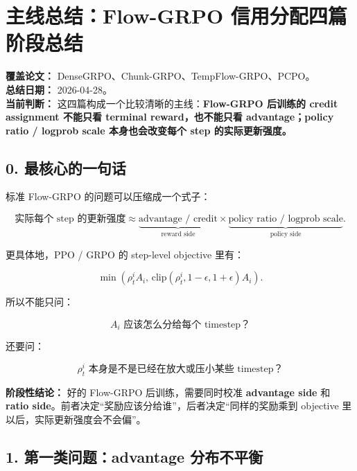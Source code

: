 
\section{主线总结：Flow-GRPO 信用分配四篇阶段总结}

\begin{conceptbox}
\textbf{覆盖论文：} DenseGRPO、Chunk-GRPO、TempFlow-GRPO、PCPO。\\
\textbf{总结日期：} 2026-04-28。\\
\textbf{当前判断：} 这四篇构成一个比较清晰的主线：\textbf{Flow-GRPO 后训练的 credit assignment 不能只看 terminal reward，也不能只看 advantage；policy ratio / logprob scale 本身也会改变每个 step 的实际更新强度。}
\end{conceptbox}

\subsection{0. 最核心的一句话}

标准 Flow-GRPO 的问题可以压缩成一个式子：

\[
\text{实际每个 step 的更新强度}
\approx
\underbrace{\text{advantage / credit}}_{\text{reward side}}
\times
\underbrace{\text{policy ratio / logprob scale}}_{\text{policy side}}.
\]

更具体地，PPO / GRPO 的 step-level objective 里有：

\[
\min
\left(
\rho_t^i A_i,\,
\mathrm{clip}(\rho_t^i,1-\epsilon,1+\epsilon)A_i
\right).
\]

所以不能只问：

\[
A_i \text{ 应该怎么分给每个 timestep？}
\]

还要问：

\[
\rho_t^i \text{ 本身是不是已经在放大或压小某些 timestep？}
\]

\begin{summarybox}
\textbf{阶段性结论：} 好的 Flow-GRPO 后训练，需要同时校准 \textbf{advantage side} 和 \textbf{ratio side}。前者决定“奖励应该分给谁”，后者决定“同样的奖励乘到 objective 里以后，实际更新强度会不会偏”。
\end{summarybox}

\subsection{1. 第一类问题：advantage 分布不平衡}

